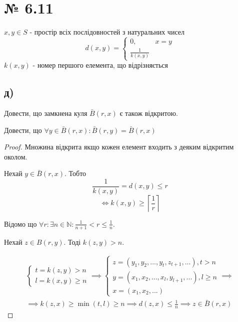 \documentclass[11pt, a4paper]{article} %
\begin{document}

\section*{№ 6.11}
\begin{mdframed}
    $x,y \in S$ - простір всіх послідовностей з натуральних чисел
    $$d(x,y) = \begin{cases}
        0, & x=y \\
        \frac{1}{k(x,y)}
    \end{cases}$$
    $k(x,y)$ - номер першого елемента, що відрізняється
\end{mdframed}

\subsection*{д) }
\begin{mdframed}
    Довести, що замкнена куля $\bar B(r,x)$ є також відкритою.  

    Довести, що $\forall y \in \bar B(r,x): \bar B(r,y) = \bar B(r,x)$
\end{mdframed}

\begin{proof}
    Множина відкрита якщо кожен елемент входить з деяким відкритим околом.
    
    Нехай $y \in \bar B(r,x)$. Тобто 
    $$\frac{1}{k(x,y)} = d(x,y) \le r $$
    $$\iff k(x,y) \ge \left\lceil \frac{1}{r} \right\rceil $$

    Відомо що $\forall r: \exists n\in \mathbb N: \frac{1}{n+1} < r \le \frac{1}{n}$.

    Нехай $z \in B(r, y)$. Тоді $k(z,y) > n $.

    \begin{multline*}
        \begin{cases}
            t = k(z,y) > n\\
            l = k(x,y) \ge n
        \end{cases} \implies \begin{cases}
            z = (y_1, y_2, ..., y_t, z_{t+1}, ...), t > n \\
            y = (x_1, x_2, ..., x_l, y_{l+1}, ...), l \ge n \\
            x = (x_1, x_2, ...)
        \end{cases} \implies \\ \implies k(z,x) \ge \min(t,l) \ge n \implies d(z, x) \le \frac{1}{n} \implies z \in \bar B(r,x) 
    \end{multline*}

\end{proof}
\end{document}
